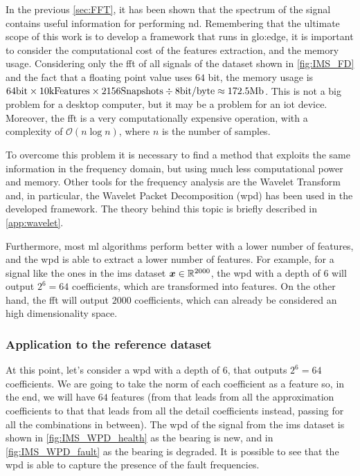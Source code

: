 In the previous \autoref{sec:FFT}, it has been shown that the spectrum of the signal contains useful information for performing \gls{nd}. Remembering that the ultimate scope of this work is to develop a framework that runs in \gls{glo:edge}, it is important to consider the computational cost of the features extraction, and the memory usage. Considering only the \gls{fft} of all signals of the dataset shown in \autoref{fig:IMS_FD} and the fact that a floating point value uses $64$ bit, the memory usage is $64 \si{\bit} \times 10 \text{kFeatures} \times 2156 \text{Snapshots} \div 8 \text{bit/byte} \approx 172.5 \text{Mb}$. This is not a big problem for a desktop computer, but it may be a problem for an \gls{iot} device. Moreover, the \gls{fft} is a very computationally expensive operation, with a complexity of $\mathcal{O}(n \log n)$, where $n$ is the number of samples.

To overcome this problem it is necessary to find a method that exploits the same information in the frequency domain, but using much less computational power and memory. Other tools for the frequency analysis are the Wavelet Transform and, in particular, the Wavelet Packet Decomposition (\gls{wpd}) has been used in the developed framework. The theory behind this topic is briefly described in \autoref{app:wavelet}.

Furthermore, most \gls{ml} algorithms perform better with a lower number of features, and the \gls{wpd} is able to extract a lower number of features. For example, for a signal like the ones in the \gls{ims} dataset $\bm{x} \in \mathbb{R}^{2000}$, the \gls{wpd} with a depth of $6$ will output $2^6=64$ coefficients, which are transformed into features. On the other hand, the \gls{fft} will output $2000$ coefficients, which can already be considered an high dimensionality space.

\subsubsection{Application to the reference dataset}

At this point, let's consider a \gls{wpd} with a depth of $6$, that outputs $2^6=64$ coefficients. We are going to take the norm of each coefficient as a feature so, in the end, we will have $64$ features (from  that leads from all the approximation coefficients to  that that leads from all the detail coefficients instead, passing for all the combinations in between). The \gls{wpd} of the  signal from the \gls{ims} dataset is shown in \autoref{fig:IMS_WPD_health} as the bearing is new, and in \autoref{fig:IMS_WPD_fault} as the bearing is degraded. It is possible to see that the \gls{wpd} is able to capture the presence of the fault frequencies.

